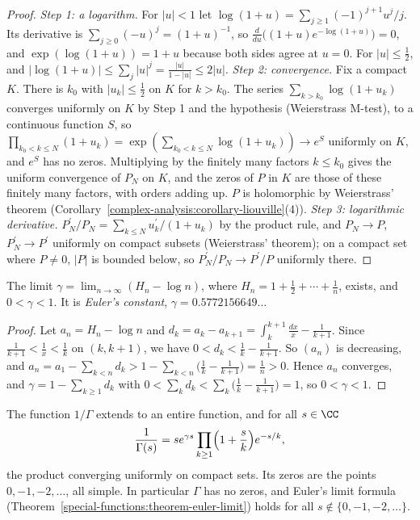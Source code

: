 \begin{proof}
\emph{Step 1: a logarithm.} For $|u| < 1$ let $\log(1 + u) = \sum_{j \geq 1}(-1)^{j+1}u^j/j$. Its derivative is $\sum_{j \geq 0}(-u)^j = (1 + u)^{-1}$, so
$\frac{d}{du}\bigl((1 + u)e^{-\log(1 + u)}\bigr) = 0$, and $\exp(\log(1 + u)) = 1 + u$ because both sides agree at $u = 0$. For $|u| \leq \frac12$, and $|\log(1 + u)| \leq \sum_j|u|^j = \frac{|u|}{1 - |u|} \leq 2|u|$.
\emph{Step 2: convergence.} Fix a compact $K$. There is $k_0$ with $|u_k| \leq \frac12$ on $K$ for $k > k_0$. The series $\sum_{k > k_0}\log(1 + u_k)$ converges uniformly on $K$ by Step 1 and the hypothesis
(Weierstrass M-test), to a continuous function $S$, so $\prod_{k_0 < k \leq N}(1 + u_k) = \exp(\sum_{k_0 < k \leq N}\log(1 + u_k)) \to e^S$ uniformly on $K$, and $e^S$ has no zeros. Multiplying by the
finitely many factors $k \leq k_0$ gives the uniform convergence of $P_N$ on $K$, and the zeros of $P$ in $K$ are those of these finitely many factors, with orders adding up. $P$ is holomorphic by
Weierstrass' theorem (Corollary~\ref{complex-analysis:corollary-liouville}(4)).
\emph{Step 3: logarithmic derivative.} $P_N^{\prime}/P_N = \sum_{k \leq N}u_k^{\prime}/(1 + u_k)$ by the product rule, and $P_N \to P$, $P_N^{\prime} \to P^{\prime}$ uniformly on compact subsets
(Weierstrass' theorem); on a compact set where $P \neq 0$, $|P|$ is bounded below, so $P_N^{\prime}/P_N \to P^{\prime}/P$ uniformly there.
\end{proof}

\begin{lemma}\label{special-functions:lemma-euler-constant}
The limit $\gamma = \lim_{n \to \infty}(H_n - \log n)$, where $H_n = 1 + \frac12 + \cdots + \frac1n$, exists, and $0 < \gamma < 1$. It is \emph{Euler's constant}, $\gamma = 0.5772156649\ldots$
\end{lemma}

\begin{proof}
Let $a_n = H_n - \log n$ and $d_k = a_k - a_{k+1} = \int_k^{k+1}\frac{dx}{x} - \frac{1}{k + 1}$. Since $\frac{1}{k+1} < \frac1x < \frac1k$ on $(k, k + 1)$, we have
$0 < d_k < \frac1k - \frac{1}{k + 1}$. So $(a_n)$ is decreasing, and $a_n = a_1 - \sum_{k<n}d_k > 1 - \sum_{k<n}\bigl(\frac1k - \frac{1}{k+1}\bigr) = \frac1n > 0$. Hence $a_n$ converges, and
$\gamma = 1 - \sum_{k \geq 1}d_k$ with $0 < \sum_kd_k < \sum_k\bigl(\frac1k - \frac{1}{k+1}\bigr) = 1$, so $0 < \gamma < 1$.
\end{proof}

\begin{theorem}\label{special-functions:theorem-weierstrass-gamma}
The function $1/\Gamma$ extends to an entire function, and for all $s \in \CC$
\[
\frac{1}{\Gamma(s)} = se^{\gamma s}\prod_{k \geq 1}\Bigl(1 + \frac sk\Bigr)e^{-s/k},
\]
the product converging uniformly on compact sets. Its zeros are the points $0, -1, -2, \ldots$, all simple. In particular $\Gamma$ has no zeros, and Euler's limit formula
(Theorem~\ref{special-functions:theorem-euler-limit}) holds for all $s \notin \{0, -1, -2, \ldots\}$.
\end{theorem}

